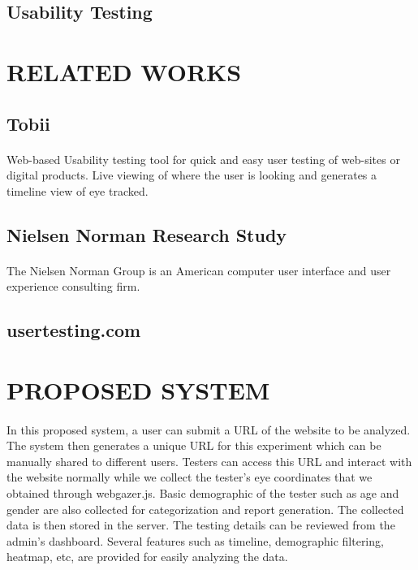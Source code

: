 \documentclass[a4paper,12pt,oneside]{article}
\begin{document}
\subsection{Usability Testing}

\newpage
\section{RELATED WORKS}
\subsection{Tobii}
\paragraph{}
Web-based Usability testing tool for quick and easy user testing of web-sites or digital products. Live viewing of where the user is looking and generates a timeline view of eye tracked.

\subsection{Nielsen Norman Research Study}
\paragraph{}
The Nielsen Norman Group is an American computer user  interface and user experience consulting firm.
\subsection{usertesting.com}

\newpage
\section{PROPOSED SYSTEM}
\paragraph{}
In this proposed system, a user can submit a URL of the website to be analyzed. The system then generates a unique URL for this experiment which can be manually shared to different users.
Testers can access this URL and interact with the website normally while we collect the tester's eye coordinates that we obtained through webgazer.js. Basic demographic of the tester such as age and gender are also collected for categorization and report generation. The collected data is then stored in the server. 
The testing details can be reviewed from the admin's dashboard. Several features such as timeline, demographic filtering, heatmap, etc, are provided for easily analyzing the data.
\end{document}
